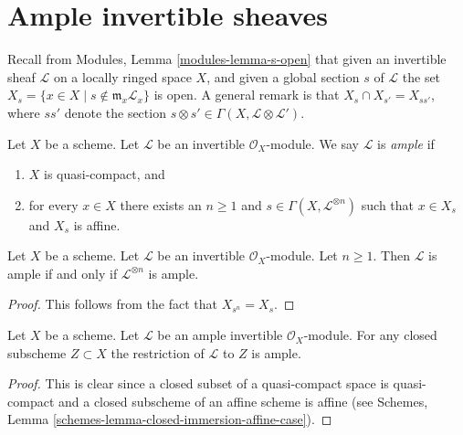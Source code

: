 \section{Ample invertible sheaves}
\label{section-ample}

\noindent
Recall from Modules, Lemma \ref{modules-lemma-s-open}
that given an invertible sheaf $\mathcal{L}$ on a locally ringed
space $X$, and given a global section $s$ of $\mathcal{L}$
the set $X_s = \{x \in X \mid s \not \in \mathfrak m_x\mathcal{L}_x\}$
is open. A general remark is that
$X_s \cap X_{s'} = X_{ss'}$, where $ss'$ denote
the section $s \otimes s' \in \Gamma(X, \mathcal{L} \otimes \mathcal{L}')$.

\begin{definition}
\label{definition-ample}
\begin{reference}
\cite[II Definition 4.5.3]{EGA}
\end{reference}
Let $X$ be a scheme.
Let $\mathcal{L}$ be an invertible $\mathcal{O}_X$-module.
We say $\mathcal{L}$ is {\it ample} if
\begin{enumerate}
\item $X$ is quasi-compact, and
\item for every $x \in X$ there exists an $n \geq 1$
and $s \in \Gamma(X, \mathcal{L}^{\otimes n})$ such
that $x \in X_s$ and $X_s$ is affine.
\end{enumerate}
\end{definition}

\begin{lemma}
\label{lemma-ample-power-ample}
\begin{reference}
\cite[II Proposition 4.5.6(i)]{EGA}
\end{reference}
Let $X$ be a scheme. Let $\mathcal{L}$ be an invertible $\mathcal{O}_X$-module.
Let $n \geq 1$. Then $\mathcal{L}$ is ample if and only if
$\mathcal{L}^{\otimes n}$ is ample.
\end{lemma}

\begin{proof}
This follows from the fact that $X_{s^n} = X_s$.
\end{proof}

\begin{lemma}
\label{lemma-ample-on-closed}
Let $X$ be a scheme.
Let $\mathcal{L}$ be an ample invertible $\mathcal{O}_X$-module.
For any closed subscheme $Z \subset X$ the restriction of
$\mathcal{L}$ to $Z$ is ample.
\end{lemma}

\begin{proof}
This is clear since a closed subset of a quasi-compact space is quasi-compact
and a closed subscheme of an affine scheme is affine (see
Schemes, Lemma \ref{schemes-lemma-closed-immersion-affine-case}).
\end{proof}

